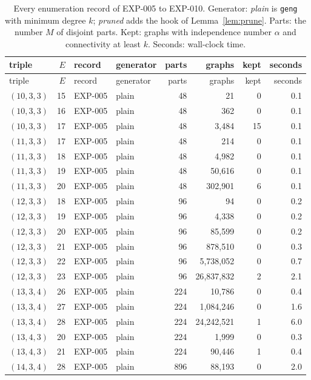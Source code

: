 \begin{longtable}{lrllrrrr}
\caption{Every enumeration record of EXP-005 to EXP-010. Generator: \emph{plain} is \texttt{geng} with minimum degree $k$; \emph{pruned} adds the hook of Lemma~\ref{lem:prune}. Parts: the number $M$ of disjoint parts. Kept: graphs with independence number $\alpha$ and connectivity at least $k$. Seconds: wall-clock time.}\label{tab:percount}\\
\toprule
triple & $E$ & record & generator & parts & graphs & kept & seconds \\
\midrule
\endfirsthead
\toprule
triple & $E$ & record & generator & parts & graphs & kept & seconds \\
\midrule
\endhead
$(10,3,3)$ & 15 & EXP-005 & plain & 48 & 21 & 0 & 0.1 \\
$(10,3,3)$ & 16 & EXP-005 & plain & 48 & 362 & 0 & 0.1 \\
$(10,3,3)$ & 17 & EXP-005 & plain & 48 & 3{,}484 & 15 & 0.1 \\
$(11,3,3)$ & 17 & EXP-005 & plain & 48 & 214 & 0 & 0.1 \\
$(11,3,3)$ & 18 & EXP-005 & plain & 48 & 4{,}982 & 0 & 0.1 \\
$(11,3,3)$ & 19 & EXP-005 & plain & 48 & 50{,}616 & 0 & 0.1 \\
$(11,3,3)$ & 20 & EXP-005 & plain & 48 & 302{,}901 & 6 & 0.1 \\
$(12,3,3)$ & 18 & EXP-005 & plain & 96 & 94 & 0 & 0.2 \\
$(12,3,3)$ & 19 & EXP-005 & plain & 96 & 4{,}338 & 0 & 0.2 \\
$(12,3,3)$ & 20 & EXP-005 & plain & 96 & 85{,}599 & 0 & 0.2 \\
$(12,3,3)$ & 21 & EXP-005 & plain & 96 & 878{,}510 & 0 & 0.3 \\
$(12,3,3)$ & 22 & EXP-005 & plain & 96 & 5{,}738{,}052 & 0 & 0.7 \\
$(12,3,3)$ & 23 & EXP-005 & plain & 96 & 26{,}837{,}832 & 2 & 2.1 \\
$(13,3,4)$ & 26 & EXP-005 & plain & 224 & 10{,}786 & 0 & 0.4 \\
$(13,3,4)$ & 27 & EXP-005 & plain & 224 & 1{,}084{,}246 & 0 & 1.6 \\
$(13,3,4)$ & 28 & EXP-005 & plain & 224 & 24{,}242{,}521 & 1 & 6.0 \\
$(13,4,3)$ & 20 & EXP-005 & plain & 224 & 1{,}999 & 0 & 0.3 \\
$(13,4,3)$ & 21 & EXP-005 & plain & 224 & 90{,}446 & 1 & 0.4 \\
$(14,3,4)$ & 28 & EXP-005 & plain & 896 & 88{,}193 & 0 & 2.0 \\

\end{longtable}
